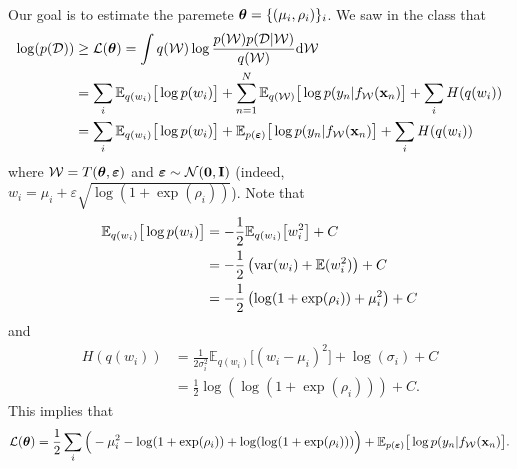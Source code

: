 \documentclass[12pt, fullpage,letterpaper]{article}
\newcommand{\beps}{\boldsymbol{\varepsilon}}
\begin{document}
\begin{enumerate}
\begin{enumerate}
{\begin{align*}
\end{align*}
Our goal is to estimate the paremete $\boldsymbol{\theta} =\{(\mu_i, \rho_i)\}_i$. We saw in the class that 
\begin{align*}
\log(p(\mathcal{D})) & \geq \mathcal{L}(\btheta) = \int q(\mathcal{W})\log\frac{p(\mathcal{W})p(\mathcal{D}|\mathcal{W})}{q(\mathcal{W})}\d\mathcal{W}\\
& = \sum_i \mathbb{E}_{q(w_i)}\big[\log p(w_i)\big] + \sum_{n=1}^N \mathbb{E}_{q(\mathcal{W})} \big[\log p(y_n | f_{\mathcal{W}}(\x_n)\big] 
+ \sum_i H(q(w_i))\\
& = \sum_i \mathbb{E}_{q(w_i)}\big[\log p(w_i)\big] + \mathbb{E}_{p(\beps)} \big[\log p(y_n | f_{\mathcal{W}}(\x_n)\big] 
+ \sum_i H(q(w_i))
\end{align*}
where $\mathcal{W} = T(\btheta,\beps)$ and $\beps\sim \N(\mathbf{0}, \mathbf{I})$ (indeed, $w_i = \mu_i+\varepsilon \sqrt{\log(1+\exp(\rho_i))}$).
Note that 
\begin{align*}
\mathbb{E}_{q(w_i)}\big[\log p(w_i)\big] & = -\frac{1}{2}\mathbb{E}_{q(w_i)}\big[w_i^2\big] + C\\
& = -\frac{1}{2}\left({\rm var}(w_i) + \mathbb{E}(w_i^2)\right)+ C\\
& =  -\frac{1}{2}\left(\log(1+\exp(\rho_i)) + \mu_i^2\right)  + C
\end{align*}
 and 
 \begin{align*}
H\left(q(w_i)\right) & = \frac{1}{2\sigma_i^2}\mathbb{E}_{q(w_i)}\big[(w_i -\mu_i)^2\big] + \log(\sigma_i) + C\\
& = \frac{1}{2}\log(\log(1+\exp(\rho_i))) + C.
\end{align*}
This implies that 
$$\mathcal{L}(\btheta) = \frac{1}{2}\sum_i\Big(-\mu_i^2 - \log(1+\exp(\rho_i)) +  \log(\log(1+\exp(\rho_i)))\Big) + \mathbb{E}_{p(\beps)} \big[\log p(y_n | f_{\mathcal{W}}(\x_n)\big] .$$


}
\end{enumerate}
\end{enumerate}
\end{document}
